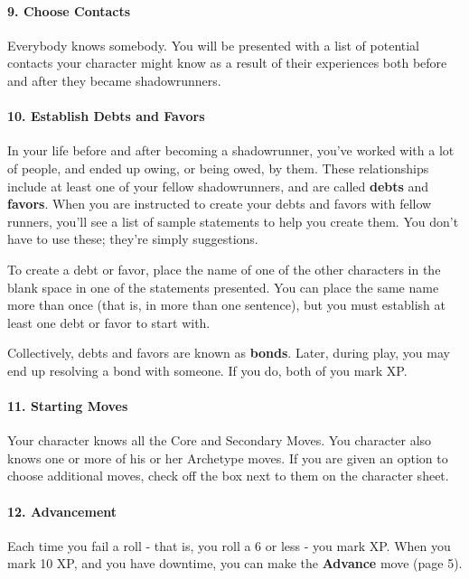 \documentclass[oneside,10pt]{article}
\begin{document}
\begin{multicols}{2}
\paragraph{9.  Choose Contacts}

Everybody knows somebody. You will be presented with a
list of potential contacts your character might know as a result of their experiences both before and after they became
shadowrunners.

\paragraph{10.  Establish Debts and Favors}

In your life before and after becoming a shadowrunner, you’ve
worked with a lot of people, and ended up owing, or being
owed, by them. These relationships include at least one of
your fellow shadowrunners, and are called \textbf{debts} and \textbf{favors}.
When you are instructed to create your debts and favors with
fellow runners, you’ll see a list of sample statements to help
you create them. You don’t have to use these; they’re simply
suggestions.

To create a debt or favor, place the name of one of the other
characters in the blank space in one of the statements presented. You can place the same name more than once (that
is, in more than one sentence), but you must establish at least
one debt or favor to start with.

Collectively, debts and favors are known as \textbf{bonds}. Later,
during play, you may end up resolving a bond with someone.
If you do, both of you mark XP.

\paragraph{11.  Starting Moves}

Your character knows all the Core and Secondary Moves.
You character also knows one or more of his or her Archetype moves. If you are given an option to choose additional
moves, check off the box next to them on the
character sheet.

\paragraph{12.  Advancement}

Each time you fail a roll - that is, you roll a 6 or less - you mark
XP. When you mark 10 XP, and you have downtime, you can
make the \textbf{Advance} move (page 5).


\end{multicols}
\end{document}
